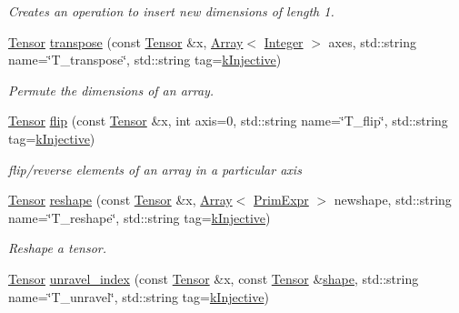 \begin{DoxyCompactItemize}
\begin{DoxyCompactList}\small\item\em Creates an operation to insert new dimensions of length 1. \end{DoxyCompactList}\item 
\hyperlink{classtvm_1_1te_1_1Tensor}{Tensor} \hyperlink{namespacetopi_adcf3c85d4cfd135e6270d4d722332107}{transpose} (const \hyperlink{classtvm_1_1te_1_1Tensor}{Tensor} \&x, \hyperlink{classtvm_1_1Array}{Array}$<$ \hyperlink{classtvm_1_1Integer}{Integer} $>$ axes, std\+::string name=\char`\"{}T\+\_\+transpose\char`\"{}, std\+::string tag=\hyperlink{namespacetopi_a60f05ec416e4618d25ad00dd9f536934}{k\+Injective})
\begin{DoxyCompactList}\small\item\em Permute the dimensions of an array. \end{DoxyCompactList}\item 
\hyperlink{classtvm_1_1te_1_1Tensor}{Tensor} \hyperlink{namespacetopi_af09ea81ad65b99ed0c39ccd4511b1e2b}{flip} (const \hyperlink{classtvm_1_1te_1_1Tensor}{Tensor} \&x, int axis=0, std\+::string name=\char`\"{}T\+\_\+flip\char`\"{}, std\+::string tag=\hyperlink{namespacetopi_a60f05ec416e4618d25ad00dd9f536934}{k\+Injective})
\begin{DoxyCompactList}\small\item\em flip/reverse elements of an array in a particular axis \end{DoxyCompactList}\item 
\hyperlink{classtvm_1_1te_1_1Tensor}{Tensor} \hyperlink{namespacetopi_a52121ee19c0cb3a9fd11bbf11c866c47}{reshape} (const \hyperlink{classtvm_1_1te_1_1Tensor}{Tensor} \&x, \hyperlink{classtvm_1_1Array}{Array}$<$ \hyperlink{classtvm_1_1PrimExpr}{Prim\+Expr} $>$ newshape, std\+::string name=\char`\"{}T\+\_\+reshape\char`\"{}, std\+::string tag=\hyperlink{namespacetopi_a60f05ec416e4618d25ad00dd9f536934}{k\+Injective})
\begin{DoxyCompactList}\small\item\em Reshape a tensor. \end{DoxyCompactList}\item 
\hyperlink{classtvm_1_1te_1_1Tensor}{Tensor} \hyperlink{namespacetopi_a9a7b635c754829e85c9595771218f1f6}{unravel\+\_\+index} (const \hyperlink{classtvm_1_1te_1_1Tensor}{Tensor} \&x, const \hyperlink{classtvm_1_1te_1_1Tensor}{Tensor} \&\hyperlink{namespacetopi_a649c66231bc50f3ed98ac8bb6b6e2518}{shape}, std\+::string name=\char`\"{}T\+\_\+unravel\char`\"{}, std\+::string tag=\hyperlink{namespacetopi_a60f05ec416e4618d25ad00dd9f536934}{k\+Injective})

\end{DoxyCompactItemize}
